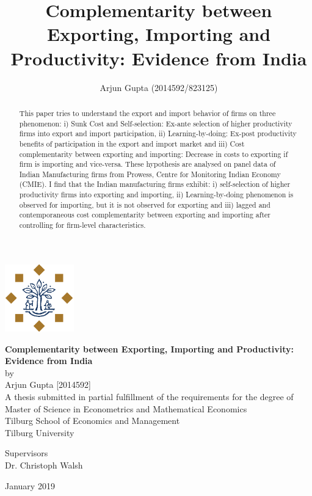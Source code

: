 \documentclass[12pt]{article}
\title{Complementarity between Exporting, Importing and Productivity: Evidence from India}
\author{Arjun Gupta (2014592/823125)}
\begin{document}

\begin{center}
\includegraphics[width=3cm]{./PICS/tilburg.png}
\bigskip
\bigskip
\bigskip
\bigskip

 \textbf{\Large Complementarity between Exporting, Importing and Productivity:
  Evidence from India}\\
\bigskip
\bigskip
by\\
Arjun Gupta [2014592]\\

\bigskip
\bigskip
\bigskip
\bigskip
 A thesis submitted in partial fulfillment of the requirements for the
 degree of Master of Science in Econometrics and Mathematical
 Economics \\
 \bigskip
\bigskip
\bigskip
\bigskip
 Tilburg School of Economics and Management\\
 Tilburg University\\
 \bigskip
\bigskip
\bigskip
\bigskip

Supervisors \\
Dr. Christoph Walsh\\
 \bigskip
\bigskip
\bigskip
\bigskip

January 2019

\maketitle
\end{center}

%  

\begin{abstract}
This paper tries to understand the export and import behavior of
firms on three phenomenon: i) Sunk Cost and Self-selection: Ex-ante selection of higher
productivity firms into export and import participation,
ii) Learning-by-doing: Ex-post productivity benefits of participation
in the export and import market and iii) Cost complementarity between exporting
and importing: Decrease in costs to exporting if firm is importing and
vice-versa. These hypothesis are analysed on panel data of Indian
Manufacturing firms from Prowess, Centre for Monitoring Indian Economy
(CMIE). I find that the Indian manufacturing firms exhibit: i) self-selection of higher productivity
firms into exporting and importing, ii) Learning-by-doing phenomenon
is observed for importing, but it is not observed for exporting and
iii) lagged and contemporaneous cost complementarity between exporting
and importing after controlling for firm-level characteristics.  
\end{abstract}
\bigskip
\end{document}
